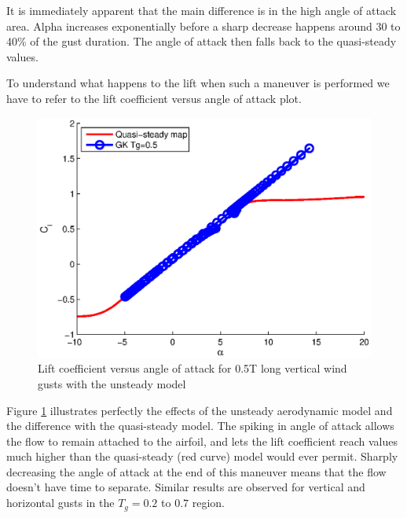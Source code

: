 \par It is immediately apparent that the main difference is in the high angle of attack area.
Alpha increases exponentially before a sharp decrease happens around 30 to 40\% of the gust duration.
The angle of attack then falls back to the quasi-steady values.

\FloatBarrier

\par To understand what happens to the lift when such a maneuver is performed we have to refer to the lift coefficient versus angle of attack plot.

\begin{figure}[h]
  \centering
  \includegraphics{./Figures/Cl_vs_alpha_wt=1_tg=0p5_alphamax=20.eps}
  \caption{Lift coefficient versus angle of attack for 0.5T long vertical wind gusts with the unsteady model}
  \label{fig:Cl_vs_alpha_short_gust_unsteady}
\end{figure}
\FloatBarrier

\par Figure \ref{fig:Cl_vs_alpha_short_gust_unsteady} illustrates perfectly the effects of the unsteady aerodynamic model and the difference with the quasi-steady model.
The spiking in angle of attack allows the flow to remain attached to the airfoil, and lets the lift coefficient reach values much higher than the quasi-steady (red curve) model would ever permit.
Sharply decreasing the angle of attack at the end of this maneuver means that the flow doesn't have time to separate.
Similar results are observed for vertical and horizontal gusts in the $T_g=0.2$ to $0.7$ region.



